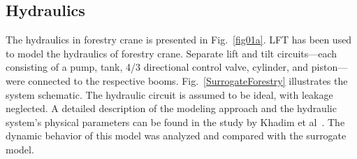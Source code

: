 \subsection{Hydraulics}
The hydraulics in forestry crane is presented in Fig.~\ref{fig01a}. LFT has been used to model the hydraulics of forestry crane. Separate lift and tilt circuits—each consisting of a pump, tank, 4/3 directional control valve, cylinder, and piston—were connected to the respective booms. Fig.~\ref{SurrogateForestry} illustrates the system schematic. The hydraulic circuit is assumed to be ideal, with leakage neglected. A detailed description of the modeling approach and the hydraulic system’s physical parameters can be found in the study by Khadim et al~\cite{KHADIM2023105405}. The dynamic behavior of this model was analyzed and compared with the surrogate model.


